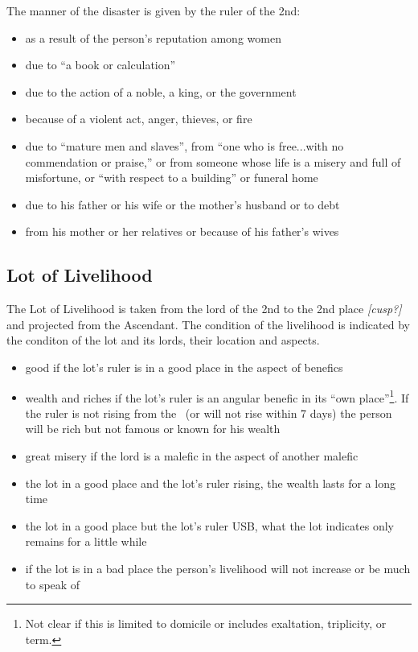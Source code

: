 The manner of the disaster is given by the ruler of the 2nd:
\begin{itemize}[topsep=0em,itemsep=0em]
\item[\Venus] as a result of the person's reputation among women

\item[\Mercury] due to ``a book or calculation''

\item[\Jupiter] due to the action of a noble, a king, or the government

\item[\Mars] because of a violent act, anger, thieves, or fire

\item[\Saturn] due to ``mature men and slaves'', from ``one who is free...with no commendation or praise,'' or from someone whose life is a misery and full of misfortune, or ``with respect to a building'' or funeral home

\item[\Sun] due to his father or his wife or the mother's husband or to debt

\item[\Moon] from his mother or her relatives or because of his father's wives
\end{itemize}

\subsection{Lot of Livelihood}
The Lot of Livelihood is taken from the lord of the 2nd to the 2nd place \textsl{[cusp?]} and projected from the Ascendant. The condition of the livelihood is indicated by the conditon of the lot and its lords, their location and aspects.

\begin{itemize}[topsep=0em,itemsep=0em]
\item good if the lot's ruler is in a good place in the aspect of benefics

\item wealth and riches if the lot's ruler is an angular benefic in its ``own place''\footnote{Not clear if this is limited to domicile or includes exaltation, triplicity, or term.}. If the ruler is not rising from the \Sun\, (or will not rise within 7 days) the person will be rich but not famous or known for his wealth

\item great misery if the lord is a malefic in the aspect of another malefic

\item the lot in a good place and the lot's ruler rising, the wealth lasts for a long time

\item the lot in a good place but the lot's ruler USB, what the lot indicates only remains for a little while

\item if the lot is in a bad place the person's livelihood will not increase or be much to speak of
\end{itemize}

